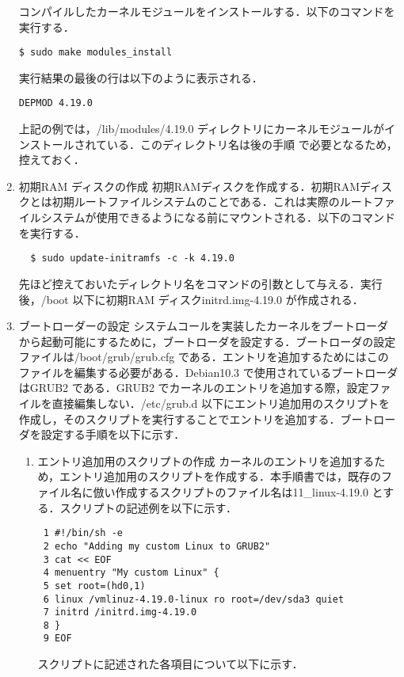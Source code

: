 \documentclass[12pt]{jsarticle}
\begin{document}
\begin{enumerate}
  コンパイルしたカーネルモジュールをインストールする．以下のコマンドを実行する．
\begin{verbatim}
$ sudo make modules_install
\end{verbatim}
実行結果の最後の行は以下のように表示される．
\begin{verbatim}
DEPMOD 4.19.0
\end{verbatim}
上記の例では，/lib/modules/4.19.0 ディレクトリにカーネルモジュールがインストールされている．このディレクトリ名は後の手順 で必要となるため，控えておく．
\item 初期RAM ディスクの作成
  初期RAMディスクを作成する．初期RAMディスクとは初期ルートファイルシステムのことである．これは実際のルートファイルシステムが使用できるようになる前にマウントされる．以下のコマンドを実行する．
\begin{verbatim}
  $ sudo update-initramfs -c -k 4.19.0
\end{verbatim}
先ほど控えておいたディレクトリ名をコマンドの引数として与える．実行後，/boot 以下に初期RAM ディスクinitrd.img-4.19.0 が作成される．
\item ブートローダーの設定
システムコールを実装したカーネルをブートローダから起動可能にするために，ブートローダを設定する．ブートローダの設定ファイルは/boot/grub/grub.cfg である．エントリを追加するためにはこのファイルを編集する必要がある．Debian10.3 で使用されているブートローダはGRUB2 である．GRUB2 でカーネルのエントリを追加する際，設定ファイルを直接編集しない．/etc/grub.d 以下にエントリ追加用のスクリプトを作成し，そのスクリプトを実行することでエントリを追加する．ブートローダを設定する手順を以下に示す．
\begin{enumerate}
\item エントリ追加用のスクリプトの作成
  カーネルのエントリを追加するため，エントリ追加用のスクリプトを作成する．本手順書では，既存のファイル名に倣い作成するスクリプトのファイル名は11_linux-4.19.0 とする．スクリプトの記述例を以下に示す．
\begin{verbatim}
 1 #!/bin/sh -e
 2 echo "Adding my custom Linux to GRUB2"
 3 cat << EOF
 4 menuentry "My custom Linux" {
 5 set root=(hd0,1)
 6 linux /vmlinuz-4.19.0-linux ro root=/dev/sda3 quiet
 7 initrd /initrd.img-4.19.0
 8 }
 9 EOF
\end{verbatim}
スクリプトに記述された各項目について以下に示す．


\end{enumerate}
\end{enumerate}
\end{document}
